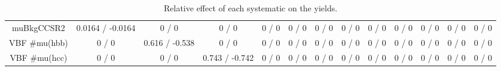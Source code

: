 \documentclass[10pt]{article}
\begin{document}
\begin{table}[htbp]
\begin{center}
\begin{tabular}{|c|c|c|c|c|c|c|c|c|c|c|c|c|}
  muBkgCCSR2 & 0.0164 / -0.0164 & 0 / 0 & 0 / 0 & 0 / 0 & 0 / 0 & 0 / 0 & 0 / 0 & 0 / 0 & 0 / 0 & 0 / 0 & 0 / 0 & 0 / 0 \\ 
  VBF #mu(hbb) & 0 / 0 & 0.616 / -0.538 & 0 / 0 & 0 / 0 & 0 / 0 & 0 / 0 & 0 / 0 & 0 / 0 & 0 / 0 & 0 / 0 & 0 / 0 & 0 / 0 \\ 
  VBF #mu(hcc) & 0 / 0 & 0 / 0 & 0.743 / -0.742 & 0 / 0 & 0 / 0 & 0 / 0 & 0 / 0 & 0 / 0 & 0 / 0 & 0 / 0 & 0 / 0 & 0 / 0 \\ 
\hline 
\end{tabular} 
\caption{Relative effect of each systematic on the yields.} 
\end{center} 
\end{table} 
\end{document}
